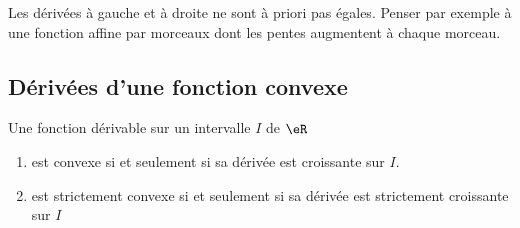 \begin{remark}
    Les dérivées à gauche et à droite ne sont à priori pas égales. Penser par exemple à une fonction affine par morceaux dont les pentes augmentent à chaque morceau.
\end{remark}

\subsection{Dérivées d'une fonction convexe}

\begin{proposition} \label{PropYKwTDPX}
    Une fonction dérivable sur un intervalle \( I\) de \( \eR\)
    \begin{enumerate}
        \item       \label{ITEMooUTSAooJvhZNm}
            est convexe si et seulement si sa dérivée est croissante sur \( I\).
        \item       \label{ITEMooLLSIooFwkxtV}
            est strictement convexe si et seulement si sa dérivée est strictement croissante sur \( I\)
    \end{enumerate}
\end{proposition}

